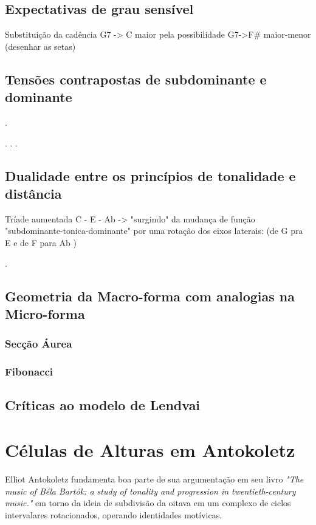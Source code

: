 \documentclass[
	12pt,				%
	openright,			%
	twoside,			%
	a4paper,			%
	english,			%
	french,				%
	spanish,			%
	brazil				%
	]{abntex2}
\begin{document}
\subsection{Expectativas de grau sensível}

Substituição da cadência G7 -> C maior pela possibilidade G7->F\# maior-menor (desenhar as setas)

\subsection{Tensões contrapostas de subdominante e dominante}
.

.
.
.


\subsection{Dualidade entre os princípios de tonalidade e distância}

Tríade aumentada C - E - Ab -> "surgindo" da mudança de função "subdominante-tonica-dominante" por uma rotação dos eixos laterais:
(de G pra E e de F para Ab )

.
\subsection{Geometria da Macro-forma com analogias na Micro-forma}

\subsubsection{Secção Áurea}


\subsubsection{Fibonacci}

\subsection{Críticas ao modelo de Lendvai}

\section{Células de Alturas em Antokoletz}


Elliot Antokoletz fundamenta boa parte de sua argumentação em seu livro \textit{"The music of Béla Bartók: a study of tonality and progression in twentieth-century music."}\cite{antokoletz1984music} em torno da ideia de subdivisão da oitava em um complexo de ciclos intervalares rotacionados, operando identidades motívicas. 
\end{document}

